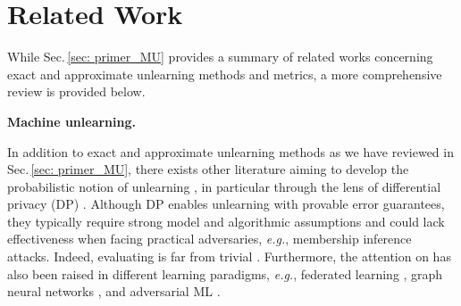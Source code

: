 \section{Related Work}
\vspace*{-2mm}
While Sec.\,\ref{sec: primer_MU} provides a summary of related works concerning exact and approximate unlearning methods and metrics,  a more comprehensive review  is provided below.

\noindent \textbf{Machine unlearning.}
\iffalse 
{\MU} was first introduced in   \cite{cao2015towards}, which aims to make  an ML model to `forget'  data points upon completion of training.   {\MU}  was originally used  to prevent the leakage of  data privacy  from the trained model,   
in particular in coming forth with legislation like  General Data Protection Regulation (GDPR) \cite{hoofnagle2019european} and  California Consumer Privacy Act (CCPA) \cite{pardau2018california}. 
A straightforward approach  to unlearning is to retrain the model from scratch (\textit{i.e.}, {\retrain}) after removing the forgetting dataset from the original training set. Although {\retrain} yields the ground-truth unlearning strategy, it is least efficient in computation. Thus,   approximate but fast unlearning    becomes a significant research focus nowadays; examples include \cite{golatkar2020eternal,warnecke2021machine,graves2021amnesiac,thudi2021unrolling,becker2022evaluating,izzo2021approximate} as we reviewed in Sec.\,\ref{sec: primer_MU}. 
\fi 
In addition to exact and approximate unlearning methods as we have reviewed in Sec.\,\ref{sec: primer_MU}, there  exists other literature aiming to  develop  the probabilistic notion of unlearning \cite{ginart2019making,guo2019certified,neel2021descent,ullah2021machine,sekhari2021remember}, in particular through the lens of differential privacy (DP) \cite{dwork2006our}. Although DP enables unlearning  with provable error guarantees, %
they typically require strong model and algorithmic assumptions and could lack effectiveness when facing practical  adversaries, \textit{e.g.}, membership inference attacks. Indeed, evaluating {\MU}  is far from trivial \cite{becker2022evaluating,thudi2022necessity,thudi2021unrolling}.  %
Furthermore, the attention on  {\MU} has also   been raised in   different learning paradigms, \textit{e.g.}, federated learning   \cite{wang2022federated,liu2022right}, graph neural networks \cite{chen2022graph,chien2022certified,cheng2023gnndelete}, and adversarial ML \cite{marchant2022hard,di2022hidden}.

